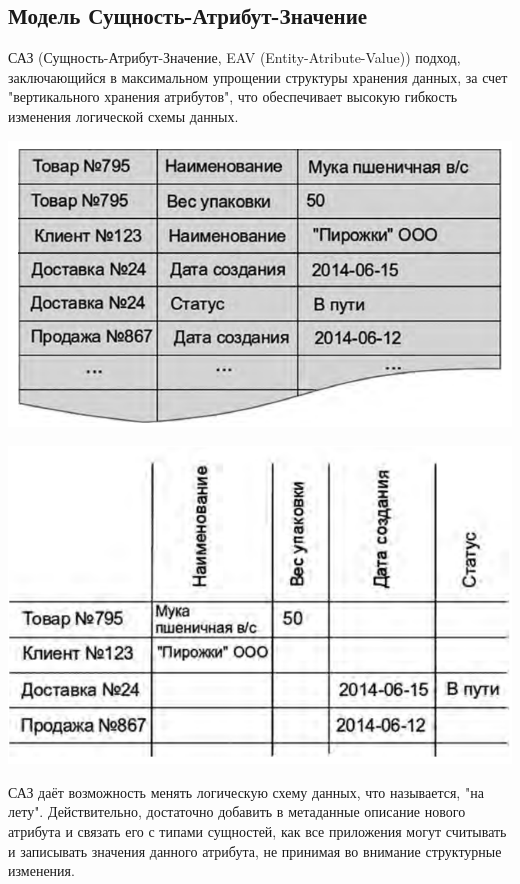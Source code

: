 \documentclass{beamer}
\begin{document}
\subsection{Модель Сущность-Атрибут-Значение}
\begin{frame}
\begin{block}{САЗ (Сущность-Атрибут-Значение, EAV (Entity-Atribute-Value))}
подход, заключающийся в максимальном упрощении структуры хранения данных, 
за счет "вертикального хранения атрибутов", что обеспечивает высокую гибкость 
изменения логической схемы данных.
\end{block}
\begin{center}
\includegraphics[scale=0.35]{images/eav-01.png}
\end{center}
\end{frame}

\begin{frame}
\begin{center}
\includegraphics[scale=0.35]{images/eav-02.png}
\end{center}
САЗ даёт возможность менять логическую схему данных, что называется, "на лету".
Действительно, достаточно добавить в метаданные описание нового атрибута и связать его с типами сущностей, как все приложения могут считывать и записывать значения данного атрибута, не принимая во внимание структурные изменения. 
\end{frame}
\end{document}
